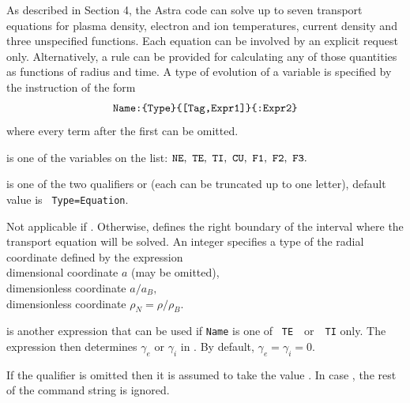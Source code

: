 As described in Section 4, the Astra code can solve up to seven transport
equations for plasma density, electron and ion temperatures, current
density and three unspecified functions.
Each equation can be involved by an explicit request only.
Alternatively, a rule can be provided for calculating any of those
quantities as functions of radius and time.
A type of evolution of a variable is specified by the
instruction of the form
\begin{equation}\label{Eq_com}
\mbox{\tt Name:\symbol{123}Type\symbol{125}\symbol{123}[Tag,Expr1]\symbol{125}\symbol{123}:Expr2\symbol{125}}
\end{equation}
where every term after the first  can be omitted. 
\begin{description}
\vspace*{-1ex}
\item[{\tt Name}] is one of the variables on the list: 
${\tt NE,~TE,~TI,~CU,~F1,~F2,~F3}.$
\vspace*{-1ex}
\item[{\tt Type}] is one of the two qualifiers  or
 (each can be truncated up to one letter), default value is
{\tt~Type=Equation}. 
\vspace*{-1ex}
\item[{\tt[Tag,Expr1]}] Not applicable if .
Otherwise,  defines the right boundary of the
interval where the transport equation will be solved.
An integer  specifies a type of the radial coordinate defined by
the expression  \\
\hspace*{2em}{\tt Tag=0~} dimensional coordinate $a$ (may be omitted),\\
\hspace*{2em}{\tt Tag=1~} dimensionless coordinate $a/a_B,$\\
\hspace*{2em}{\tt Tag=2~} dimensionless coordinate $\rho_N=\rho/\rho_B.$
\vspace*{-1ex}
\item[{\tt Expr2}] is another expression that can be used if {\tt Name}
is one of ~{\tt TE}~~or~~{\tt TI} only.
The expression then determines $\gamma_e$ or $\gamma_i$ in .
By default, $\gamma_e=\gamma_i=0.$
\end{description}
\vspace*{-1ex}
If the qualifier  is omitted then it is assumed to take the
value . 
In case , the rest of the command string is ignored.
